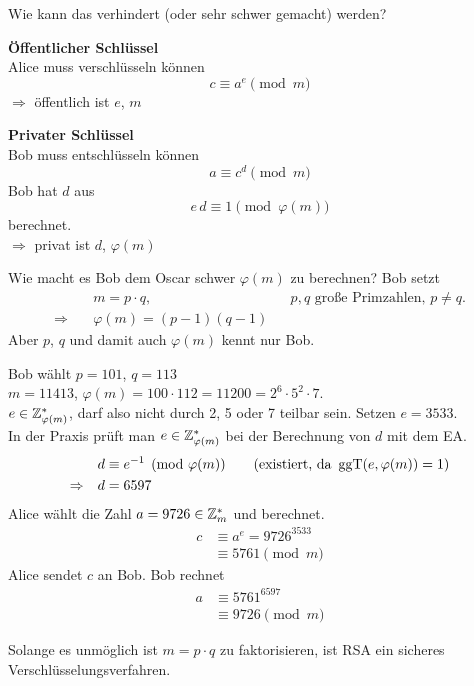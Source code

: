 Wie kann das verhindert (oder sehr schwer gemacht) werden?

\begin{definition}
\textbf{Öffentlicher Schlüssel}\\
Alice muss verschlüsseln können
\[
  c \equiv a^e \pmod{m}
\]
$\Rightarrow$ \quad öffentlich ist $e$, $m$

\textbf{Privater Schlüssel}\\
Bob muss entschlüsseln können
\[
  a \equiv c^d \pmod{m}
\]
Bob hat $d$ aus
\[
  e\,d \equiv 1 \pmod{\varphi(m)}
\]
berechnet.\\
$\Rightarrow$ \quad privat ist $d$, $\varphi(m)$
\end{definition}

Wie macht es Bob dem Oscar schwer $\varphi(m)$ zu berechnen? Bob setzt
\begin{align*}
  & m = p \cdot q, && p, q \text{ große Primzahlen, } p \neq q. \\
  \Rightarrow\quad & \varphi(m) = (p - 1)(q - 1)
\end{align*}
Aber $p$, $q$ und damit auch $\varphi(m)$ kennt nur Bob.

\begin{beispiel}
Bob wählt $p = 101$, $q = 113$\\
$m = 11413$, \quad $\varphi(m) = 100 \cdot 112 = 11200 = 2^6 \cdot 5^2 \cdot 7$.\\
$e \in \mathbb{Z}_{\varphi(m)}^*$, darf also nicht durch 2, 5 oder 7 teilbar sein. Setzen $e = 3533$.\\
In der Praxis prüft man $e \in \mathbb{Z}_{\varphi(m)}^*$ bei der Berechnung von $d$ mit dem EA.
\begin{align*}
  & d \equiv e^{-1} \pmod{\varphi(m)} \qquad (\text{existiert, da } \operatorname{ggT}(e, \varphi(m)) = 1) \\
  \Rightarrow\quad & d = 6597
\end{align*}
Alice wählt die Zahl $a = 9726 \in \mathbb{Z}_{m}^*$ und berechnet.
\begin{align*}
  c &\equiv a^e = 9726^{3533} \\
    &\equiv 5761 \pmod{m}
\end{align*}
Alice sendet $c$ an Bob. Bob rechnet
\begin{align*}
  a &\equiv 5761^{6597} \\
    &\equiv 9726 \pmod{m}
\end{align*}
\end{beispiel}

\begin{bemerkung}[Fazit]
Solange es unmöglich ist $m = p \cdot q$ zu faktorisieren, ist RSA ein sicheres Verschlüsselungsverfahren.
\end{bemerkung}
